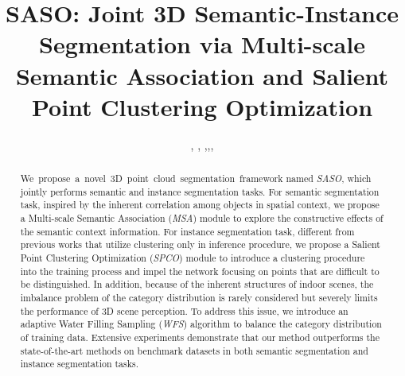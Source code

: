 \documentclass{cta-author}
\begin{document}

\title{\LARGE SASO: Joint 3D Semantic-Instance Segmentation via Multi-scale Semantic Association and Salient Point Clustering Optimization}

\author{, , ,,,}

\address{
}

\begin{abstract}
We propose a novel 3D point cloud segmentation framework named \textit{SASO}, which jointly performs semantic and instance segmentation tasks. For semantic segmentation task, inspired by the inherent correlation among objects in spatial context, we propose a Multi-scale Semantic Association (\textit{MSA}) module to explore the constructive effects of the semantic context information. For instance segmentation task, different from previous works that utilize clustering only in inference procedure, we propose a Salient Point Clustering Optimization (\textit{SPCO}) module to introduce a clustering procedure into the training process and impel the network focusing on points that are difficult to be distinguished. In addition, because of the inherent structures of indoor scenes, the imbalance problem of the category distribution is rarely considered but severely limits the performance of 3D scene perception. To address this issue, we introduce an adaptive Water Filling Sampling (\textit{WFS}) algorithm to balance the category distribution of training data.
Extensive experiments demonstrate that our method outperforms the state-of-the-art methods on benchmark datasets in both semantic segmentation and instance segmentation tasks.
\end{abstract}

\maketitle
\end{document}
